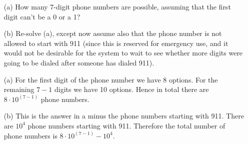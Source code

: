 

\setcounter{theorem}{1}
\begin{exercise}[BH.1.2]

\begin{enumerate}
		\item[(a)]  How many 7-digit phone numbers are possible, assuming that the first digit can't
		be a 0 or a 1?
		\item[(b)] Re-solve (a), except now assume also that the phone number is not allowed to start
		with 911 (since this is reserved for emergency use, and it would not be desirable for the
		system to wait to see whether more digits were going to be dialed after someone has
		dialed 911).
	\end{enumerate} 
	\begin{solution}
	\begin{enumerate}
	\item[(a)]  For the first digit of the phone number we have 8 options. For the remaining $7-1$ digits we have 10 options. Hence in total there are $8\cdot 10^{(7-1)}$ phone numbers.  
	\item[(b)] This is the answer in a minus the phone numbers starting with 911. There are $10^4$ phone numbers starting with 911. Therefore the total number of phone numbers is $8\cdot 10^{(7-1)}-10^4$. 
\end{enumerate} 
	\end{solution}
\end{exercise}



